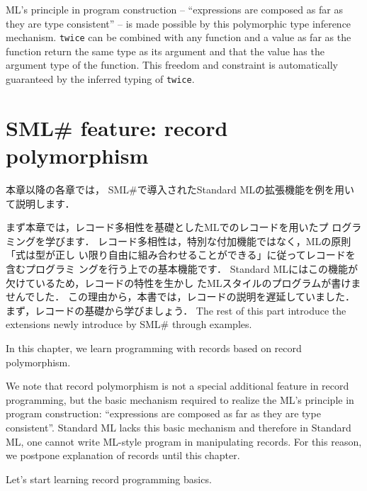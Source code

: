 \documentclass{jbook}
\newcommand{\txt}[2]{#2}
\newcommand{\smlsharp}{SML\#}
\begin{document}
	ML's principle in program construction -- ``expressions are
composed as far as they are type consistent'' -- is made possible by
this polymorphic type inference mechanism.
	{\tt twice} can be combined with any function and a value as far
as the function return the same type as its argument and that the value
has the argument type of the function.
	This freedom and constraint is automatically guaranteed by the
inferred typing of {\tt twice}.
\fi%

\chapter{
\txt{\smlsharp{}の拡張機能：レコード多相性}
    {\smlsharp{} feature: record polymorphism}
}
\label{chap:tutorialRecordpolymorphism}

\ifjp%
	本章以降の各章では，
\smlsharp{}で導入されたStandard MLの拡張機能を例を用いて説明します．

	まず本章では，レコード多相性を基礎としたMLでのレコードを用いたプ
ログラミングを学びます．
	レコード多相性は，特別な付加機能ではなく，MLの原則「式は型が正し
い限り自由に組み合わせることができる」に従ってレコードを含むプログラミ
ングを行う上での基本機能です．
	Standard MLにはこの機能が欠けているため，レコードの特性を生かし
たMLスタイルのプログラムが書けませんでした．
	この理由から，本書では，レコードの説明を遅延していました．
	まず，レコードの基礎から学びましょう．
\else%
	The rest of this part introduce the extensions newly introduce
by \smlsharp{} through examples.

	In this chapter, we learn programming with records based on 
record polymorphism.

	We note that record polymorphism is not a special additional
feature in record programming, but the basic mechanism required to
realize the ML's principle in program construction: ``expressions are
composed as far as they are type consistent''.
	Standard ML lacks this basic mechanism and therefore in Standard
ML, one cannot write ML-style program in manipulating records.
	For this reason, we postpone explanation of records until this
chapter.

	Let's start learning record programming basics.
\fi%
\end{document}
